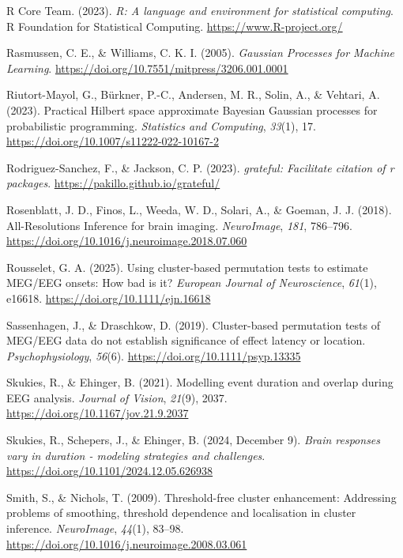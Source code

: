 \documentclass[
  doc,
  floatsintext,
  longtable,
  a4paper,
  nolmodern,
  notxfonts,
  notimes,
  colorlinks=true,linkcolor=blue,citecolor=blue,urlcolor=blue]{apa7}
\newlength{\cslhangindent}
\newenvironment{CSLReferences}[2] %
 {\begin{list}{}{%
  \setlength{\itemindent}{0pt}
  \setlength{\leftmargin}{0pt}
  \setlength{\parsep}{0pt}
  \ifodd #1
   \setlength{\leftmargin}{\cslhangindent}
   \setlength{\itemindent}{-1\cslhangindent}
  \fi
  \setlength{\itemsep}{#2\baselineskip}}}
 {\end{list}}
\begin{document}
\begin{CSLReferences}{1}{0}
R Core Team. (2023). \emph{{R}: A language and environment for
statistical computing}. R Foundation for Statistical Computing.
\url{https://www.R-project.org/}

Rasmussen, C. E., \& Williams, C. K. I. (2005). \emph{Gaussian Processes
for Machine Learning}.
\url{https://doi.org/10.7551/mitpress/3206.001.0001}

Riutort-Mayol, G., Bürkner, P.-C., Andersen, M. R., Solin, A., \&
Vehtari, A. (2023). Practical {Hilbert} space approximate {Bayesian
Gaussian} processes for probabilistic programming. \emph{Statistics and
Computing}, \emph{33}(1), 17.
\url{https://doi.org/10.1007/s11222-022-10167-2}

Rodriguez-Sanchez, F., \& Jackson, C. P. (2023). \emph{{grateful}:
Facilitate citation of r packages}.
\url{https://pakillo.github.io/grateful/}

Rosenblatt, J. D., Finos, L., Weeda, W. D., Solari, A., \& Goeman, J. J.
(2018). All-Resolutions Inference for brain imaging. \emph{NeuroImage},
\emph{181}, 786--796.
\url{https://doi.org/10.1016/j.neuroimage.2018.07.060}

Rousselet, G. A. (2025). Using cluster-based permutation tests to
estimate {MEG}/{EEG} onsets: {How} bad is it? \emph{European Journal of
Neuroscience}, \emph{61}(1), e16618.
\url{https://doi.org/10.1111/ejn.16618}

Sassenhagen, J., \& Draschkow, D. (2019). Cluster{-}based permutation
tests of MEG/EEG data do not establish significance of effect latency or
location. \emph{Psychophysiology}, \emph{56}(6).
\url{https://doi.org/10.1111/psyp.13335}

Skukies, R., \& Ehinger, B. (2021). Modelling event duration and overlap
during {EEG} analysis. \emph{Journal of Vision}, \emph{21}(9), 2037.
\url{https://doi.org/10.1167/jov.21.9.2037}

Skukies, R., Schepers, J., \& Ehinger, B. (2024, December 9).
\emph{Brain responses vary in duration - modeling strategies and
challenges}. \url{https://doi.org/10.1101/2024.12.05.626938}

Smith, S., \& Nichols, T. (2009). Threshold-free cluster enhancement:
Addressing problems of smoothing, threshold dependence and localisation
in cluster inference. \emph{NeuroImage}, \emph{44}(1), 83--98.
\url{https://doi.org/10.1016/j.neuroimage.2008.03.061}


\end{CSLReferences}
\end{document}
